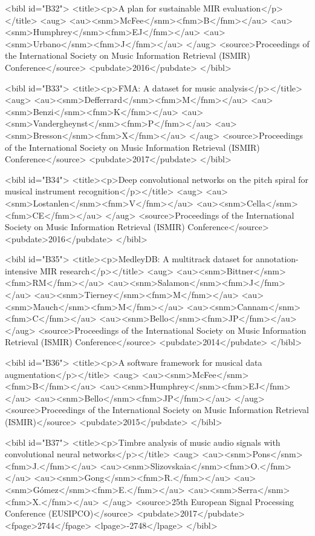 \documentclass{bmcart}
\begin{document}
\begin{backmatter}
{<bibl id="B32">
  <title><p>{A plan for sustainable {MIR} evaluation}</p></title>
  <aug>
    <au><snm>McFee</snm><fnm>B</fnm></au>
    <au><snm>Humphrey</snm><fnm>EJ</fnm></au>
    <au><snm>Urbano</snm><fnm>J</fnm></au>
  </aug>
  <source>Proceedings of the International Society on Music Information
  Retrieval (ISMIR) Conference</source>
  <pubdate>2016</pubdate>
</bibl>

<bibl id="B33">
  <title><p>{FMA: A dataset for music analysis}</p></title>
  <aug>
    <au><snm>Defferrard</snm><fnm>M</fnm></au>
    <au><snm>Benzi</snm><fnm>K</fnm></au>
    <au><snm>Vandergheynst</snm><fnm>P</fnm></au>
    <au><snm>Bresson</snm><fnm>X</fnm></au>
  </aug>
  <source>Proceedings of the International Society on Music Information
  Retrieval (ISMIR) Conference</source>
  <pubdate>2017</pubdate>
</bibl>

<bibl id="B34">
  <title><p>Deep convolutional networks on the pitch spiral for musical
  instrument recognition</p></title>
  <aug>
    <au><snm>Lostanlen</snm><fnm>V</fnm></au>
    <au><snm>Cella</snm><fnm>CE</fnm></au>
  </aug>
  <source>Proceedings of the International Society on Music Information
  Retrieval (ISMIR) Conference</source>
  <pubdate>2016</pubdate>
</bibl>

<bibl id="B35">
  <title><p>{MedleyDB: A multitrack dataset for annotation-intensive MIR
  research}</p></title>
  <aug>
    <au><snm>Bittner</snm><fnm>RM</fnm></au>
    <au><snm>Salamon</snm><fnm>J</fnm></au>
    <au><snm>Tierney</snm><fnm>M</fnm></au>
    <au><snm>Mauch</snm><fnm>M</fnm></au>
    <au><snm>Cannam</snm><fnm>C</fnm></au>
    <au><snm>Bello</snm><fnm>JP</fnm></au>
  </aug>
  <source>Proceedings of the International Society on Music Information
  Retrieval (ISMIR) Conference</source>
  <pubdate>2014</pubdate>
</bibl>

<bibl id="B36">
  <title><p>A software framework for musical data augmentation</p></title>
  <aug>
    <au><snm>McFee</snm><fnm>B</fnm></au>
    <au><snm>Humphrey</snm><fnm>EJ</fnm></au>
    <au><snm>Bello</snm><fnm>JP</fnm></au>
  </aug>
  <source>Proceedings of the International Society on Music Information
  Retrieval (ISMIR)</source>
  <pubdate>2015</pubdate>
</bibl>

<bibl id="B37">
  <title><p>Timbre analysis of music audio signals with convolutional neural
  networks</p></title>
  <aug>
    <au><snm>{Pons}</snm><fnm>J.</fnm></au>
    <au><snm>{Slizovskaia}</snm><fnm>O.</fnm></au>
    <au><snm>{Gong}</snm><fnm>R.</fnm></au>
    <au><snm>{G\'{o}mez}</snm><fnm>E.</fnm></au>
    <au><snm>{Serra}</snm><fnm>X.</fnm></au>
  </aug>
  <source>25th European Signal Processing Conference (EUSIPCO)</source>
  <pubdate>2017</pubdate>
  <fpage>2744</fpage>
  <lpage>-2748</lpage>
</bibl>

}
\end{backmatter}
\end{document}
